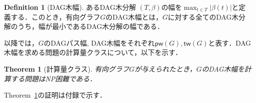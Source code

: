 \documentclass[master]{kuisthesis}		%
\theoremstyle{plain}
\newtheorem{theorem}{Theorem}
\theoremstyle{definition}
\newtheorem{definition*}{Definition}
\begin{document}
\begin{definition*}[DAG木幅]
    あるDAG木分解 $(T, \beta)$の幅を$\max_{t \in T}|\beta(t)|$と定義する．このとき，有向グラフ$G$のDAG木幅とは，$G$に対する全てのDAG木分解のうち，幅が最小であるDAG木分解の幅である．
\end{definition*}

以降では，$G$のDAGパス幅, DAG木幅をそれぞれ$\mathsf{pw}(G), \mathsf{tw}(G)$と表す．DAG木幅を求める問題の計算量クラスについて，以下を示す．

\begin{theorem}[計算量クラス]\label{NP困難}
    有向グラフ$G$が与えられたとき，$G$のDAG木幅を計算する問題はNP困難である．
\end{theorem}

Theorem~\ref{NP困難}の証明は付録で示す．
\end{document}
